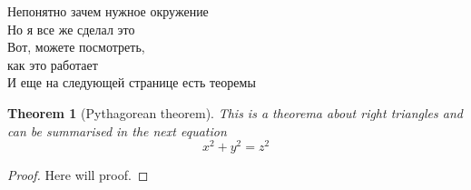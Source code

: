 \documentclass{article}
\newenvironment{myquotation}%
	{\begin{center}\begin{itshape}}%
	{\end{itshape}\end{center}}
\newtheorem{theorem}{Theorem}[section]
\begin{document}
	\begin{myquotation}
		Непонятно зачем нужное окружение\\
		Но я все же сделал это\\
		Вот, можете посмотреть,\\
		как это работает\\
		И еще на следующей странице есть теоремы
	\end{myquotation}
	
	\newpage
		
	\begin{theorem}[Pythagorean theorem]
		\label{pythagorean}
		This is a theorema about right triangles and can be summarised in the next 
equation 
		\[ x^2 + y^2 = z^2 \]
	\end{theorem}
	
	\begin{proof}
		Here will proof.
	\end{proof}
\end{document}
